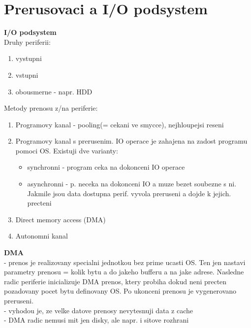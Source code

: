 \documentclass[10pt]{article}
\begin{document}
\section*{Prerusovaci a I/O podsystem}
\textbf{I/O podsystem}\\
Druhy periferii:
\begin{enumerate}
\item vystupni
\item vstupni
\item obousmerne - napr. HDD
\end{enumerate}

Metody prenosu z/na periferie:
\begin{enumerate}
\item Programovy kanal - pooling(= cekani ve smycce), nejhloupejsi reseni
\item Programovy kanal s prerusenim. IO operace je zahajena na zadost programu pomoci OS. Existuji dve varianty: \begin{itemize}
	\item synchronni - program ceka na dokonceni IO operace
	\item asynchronni - p. neceka na dokonceni IO a muze bezet soubezne s ni. Jakmile jsou data dostupna perif. vyvola preruseni a dojde k jejich. precteni
	\end{itemize}
	
\item Direct memory access (DMA)
\item Autonomni kanal
\end{enumerate}

\textbf{DMA}\\
- prenos je realizovany specialni jednotkou bez prime ucasti OS. Ten jen nastavi parametry prenosu = kolik bytu a do jakeho bufferu a na jake adrese. Nasledne radic periferie inicializuje DMA prenos, ktery probiha dokud neni precten pozadovany pocet bytu definovany OS. Po ukonceni prenosu je vygenerovano preruseni.\\
- vyhodou je, ze velke datove prenosy nevytesnuji data z cache\\
- DMA radic nemusi mit jen disky, ale napr. i sitove rozhrani\\
\end{document}
